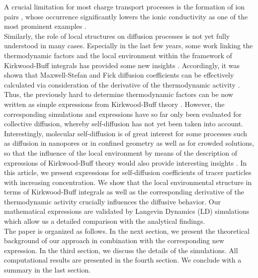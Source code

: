 \documentclass[aip,jcp,reprint]{revtex4-1}
\begin{document}
A crucial limitation for most charge transport processes is the formation of ion pairs  \cite{marcus06a,vanderVegt16a,smiatek18a,smiatek20a,narayanan18a,smiatek20b,miranda20a,yang20a,krishnamoorthy18b,smiatek19a}, whose occurrence significantly lowers the ionic conductivity as one of the most prominent examples \cite{schroder09a,krishnamoorthy16a,smiatek18a,smiatek20a,krishnamoorthy18c,nandy19a}. \\
Similarly, the role of local structures on diffusion processes is not yet fully understood in many cases. Especially in the last few years, some work linking the thermodynamic factors and the local environment within the framework of Kirkwood-Buff integrals has provided some new insights \cite{bardow15a,guevara16a,janzen17a,liu11a,liu13a,rosenberger20a}. Accordingly, it was shown that Maxwell-Stefan and Fick diffusion coefficients can be effectively calculated via consideration of the derivative of the thermodynamic activity \cite{bardow15a,guevara16a,janzen17a,liu11a,liu13a,rosenberger20a}. Thus, the previously hard to determine thermodynamic factors can be now written as simple expressions from Kirkwood-Buff theory \cite{kirkwood51,ben13a,pierce08a,smith06,smiatek17a,zingrebe18b,simon22a}. However, the corresponding simulations and expressions have so far only been evaluated for collective diffusion, whereby self-diffusion has not yet been taken into account. Interestingly,  molecular self-diffusion is of great interest for some processes such as diffusion in nanopores or in confined geometry as well as for crowded solutions, so that the influence of the local environment by means of the description of expressions of Kirkwood-Buff theory would also provide interesting insights \cite{simon22a,jamali18a,jamali20a,roosen11a,dix08a}.
In this article, we present expressions for self-diffusion coefficients of tracer particles with increasing concentration. We show that the local environmental structure in terms of Kirkwood-Buff integrals as well as the corresponding derivative of the thermodynamic activity crucially influences the diffusive behavior.  Our mathematical expressions are validated by Langevin Dynamics (LD) simulations which allow us a detailed comparison with the analytical findings. \\
The paper is organized as follows. In the next section, we present the theoretical background of our approach in combination with the corresponding new expression. In the third section, we discuss  the details of the 
simulations. All computational results are  presented in the fourth section. 
We conclude with a summary in the last section.
\end{document}
